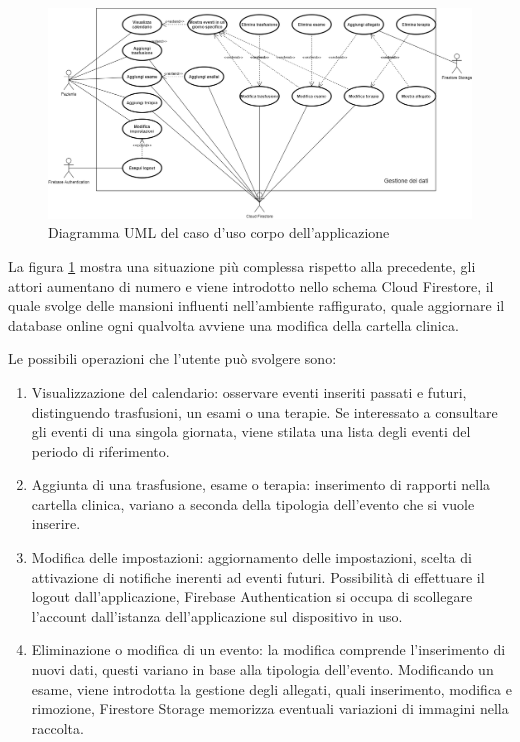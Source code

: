 \documentclass[12pt,a4paper,openright,twoside]{report}
\begin{document}
\begin{figure}[h] 
\begin{center}
\includegraphics[width= 1.1\textwidth, height=1\textheight, keepaspectratio]{img/Diagrammi/Diagrammi-TalApp.png}
\caption{Diagramma UML del caso d'uso corpo dell'applicazione} \label{2.2}
\end{center}
\end{figure}

La figura \ref{2.2} mostra una situazione più complessa rispetto alla precedente, gli attori aumentano di numero e viene introdotto nello schema Cloud Firestore, il quale svolge delle mansioni influenti nell'ambiente raffigurato, quale aggiornare il database online ogni qualvolta avviene una modifica della cartella clinica.

Le possibili operazioni che l'utente può svolgere sono: 

\begin{enumerate}
    \item Visualizzazione del calendario: osservare eventi inseriti passati e futuri, distinguendo trasfusioni, un esami o una terapie. Se interessato a consultare gli eventi di una singola giornata, viene stilata una lista degli eventi del periodo di riferimento. 
    \item Aggiunta di una trasfusione, esame o terapia: inserimento di rapporti nella cartella clinica, variano a seconda della tipologia dell'evento che si vuole inserire.  
    \item Modifica delle impostazioni: aggiornamento delle impostazioni, scelta di attivazione di notifiche inerenti ad eventi futuri. Possibilità di effettuare il logout dall'applicazione, Firebase Authentication si occupa di scollegare l'account dall'istanza dell'applicazione sul dispositivo in uso.
    \item Eliminazione o modifica di un evento: la modifica comprende l'inserimento di nuovi dati, questi variano in base alla tipologia dell'evento. Modificando un esame, viene introdotta la gestione degli allegati, quali inserimento, modifica e rimozione, Firestore Storage memorizza eventuali variazioni di immagini nella raccolta.
\end{enumerate}
\end{document}
